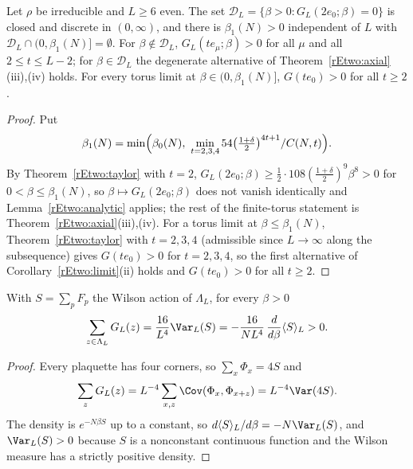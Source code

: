 \begin{corollary}\label{rEtwo:exceptional}
Let $\rho$ be irreducible and $L\ge6$ even. The set $\mathcal D_L=\{\beta>0:
G_L(2e_0;\beta)=0\}$ is closed and discrete in $(0,\infty)$, and there is
$\beta_1(N)>0$ independent of $L$ with $\mathcal D_L\cap(0,\beta_1(N)]=
\emptyset$. For $\beta\notin\mathcal D_L$, $G_L(te_\mu;\beta)>0$ for all
$\mu$ and all $2\le t\le L-2$; for $\beta\in\mathcal D_L$ the degenerate
alternative of Theorem~\textup{\ref{rEtwo:axial}(iii),(iv)} holds. For
every torus limit at $\beta\in(0,\beta_1(N)]$, $G(te_0)>0$ for all
$t\ge2$.
\end{corollary}

\begin{proof}
Put
\[
\beta_1(N)=\min\Bigl(\beta_0(N),\ \min_{t=2,3,4}54\bigl(\tfrac{1+\delta}2
\bigr)^{4t+1}/C(N,t)\Bigr).
\]
By Theorem~\ref{rEtwo:taylor} with $t=2$,
$G_L(2e_0;\beta)\ge\frac12\cdot108(\frac{1+\delta}2)^9\beta^8>0$ for $0<\beta
\le\beta_1(N)$, so $\beta\mapsto G_L(2e_0;\beta)$ does not vanish
identically and Lemma~\ref{rEtwo:analytic} applies; the rest of the
finite-torus statement is Theorem~\ref{rEtwo:axial}(iii),(iv). For a torus
limit at $\beta\le\beta_1(N)$, Theorem~\ref{rEtwo:taylor} with $t=2,3,4$
(admissible since $L\to\infty$ along the subsequence) gives $G(te_0)>0$
for $t=2,3,4$, so the first alternative of Corollary~\ref{rEtwo:limit}(ii)
holds and $G(te_0)>0$ for all $t\ge2$.
\end{proof}

\begin{proposition}\label{rEtwo:sumrule}
With $S=\sum_{p}F_p$ the Wilson action of $\Lambda_L$, for every $\beta>0$
\[
\sum_{z\in\Lambda_L}G_L(z)=\frac{16}{L^4}\Var_L(S)=-\frac{16}
{NL^4}\,\frac{d}{d\beta}\langle S\rangle_L>0 .
\]
\end{proposition}

\begin{proof}
Every plaquette has four corners, so $\sum_x\Phi_x=4S$ and
\[
\sum_zG_L(z)=L^{-4}\sum_{x,z}\Cov(\Phi_x,\Phi_{x+z})=L^{-4}\Var(4S).
\]
The density is
$e^{-N\beta S}$ up to a constant, so $d\langle S\rangle_L/d\beta=-N\Var_L(S)$,
and $\Var_L(S)>0$ because $S$ is a nonconstant continuous function and the
Wilson measure has a strictly positive density.
\end{proof}


